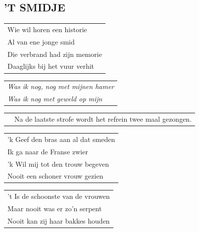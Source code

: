 \documentclass{article}
\begin{document}
\subsection*{'T SMIDJE}
\begin{flushleft}
\begin{tabularx}{0.8\textwidth} {
   >{\raggedright\arraybackslash}X}  Wie wil horen een historie\\
Al van ene jonge smid\\
Die verbrand had zijn memorie\\
Daaglijks bij het vuur verhit\\
\end{tabularx}
\end{flushleft}\begin{flushleft}
\begin{tabularx}{0.8\textwidth} {
   >{\raggedright\arraybackslash}X}
\textit{Was ik nog, nog met mijnen hamer}\\
\textit{Was ik nog met geweld op mijn} \\
\end{tabularx}
\end{flushleft}\begin{flushleft}
\begin{tabularx}{0.8\textwidth} {
    c >{\raggedright\arraybackslash}X}
\hspace{5mm} & {\small Na de laatste strofe wordt het refrein twee maal gezongen.}\\
\end{tabularx}
\end{flushleft}\begin{flushleft}
\begin{tabularx}{0.8\textwidth} {
   >{\raggedright\arraybackslash}X}
’k Geef den bras aan al dat smeden\\
Ik ga naar de Franse zwier\\
’k Wil mij tot den trouw begeven\\
Nooit een schoner vrouw gezien\\
\end{tabularx}
\end{flushleft}\begin{flushleft}
\begin{tabularx}{0.8\textwidth} {
   >{\raggedright\arraybackslash}X}
’t Is de schoonste van de vrouwen\\
Maar nooit was er zo’n serpent\\
Nooit kan zij haar bakkes houden\\

\end{tabularx}
\end{flushleft}
\end{document}
